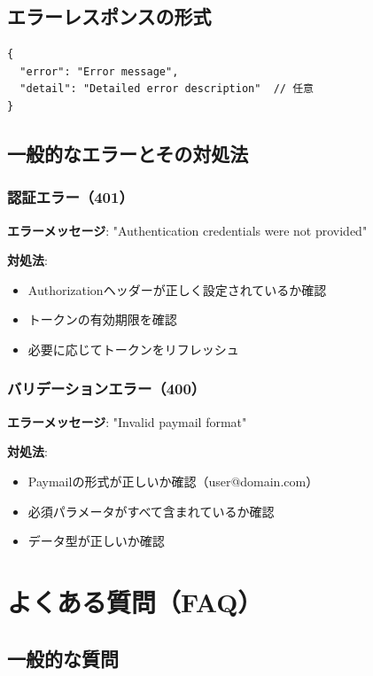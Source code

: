 \documentclass[11pt,a4paper]{ltjsarticle}  %
\begin{document}
\subsection{エラーレスポンスの形式}

\begin{lstlisting}[style=json]
{
  "error": "Error message",
  "detail": "Detailed error description"  // 任意
}
\end{lstlisting}

\subsection{一般的なエラーとその対処法}

\subsubsection{認証エラー（401）}
\textbf{エラーメッセージ}: "Authentication credentials were not provided"

\textbf{対処法}:
\begin{itemize}
    \item Authorizationヘッダーが正しく設定されているか確認
    \item トークンの有効期限を確認
    \item 必要に応じてトークンをリフレッシュ
\end{itemize}

\subsubsection{バリデーションエラー（400）}
\textbf{エラーメッセージ}: "Invalid paymail format"

\textbf{対処法}:
\begin{itemize}
    \item Paymailの形式が正しいか確認（user@domain.com）
    \item 必須パラメータがすべて含まれているか確認
    \item データ型が正しいか確認
\end{itemize}


\section{よくある質問（FAQ）}

\subsection{一般的な質問}
\end{document}
